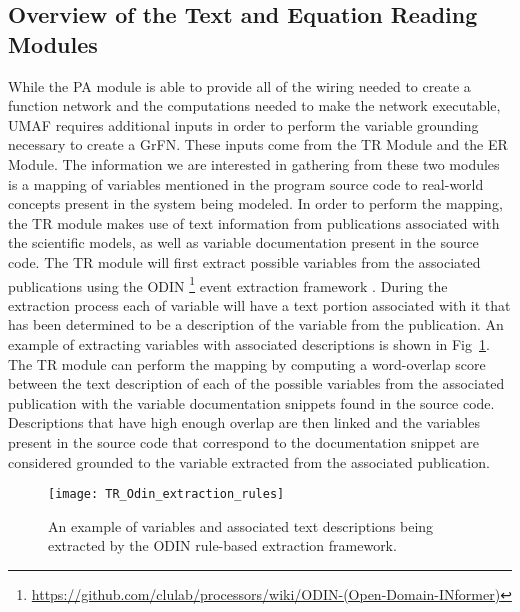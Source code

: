 \subsection{Overview of the Text and Equation Reading Modules \label{sec:ter_overview}}
While the PA module is able to provide all of the wiring needed to create a function network and the computations needed to make the network executable, UMAF requires additional inputs in order to perform the variable grounding necessary to create a GrFN.
These inputs come from the TR Module and the ER Module.
The information we are interested in gathering from these two modules is a mapping of variables mentioned in the program source code to real-world concepts present in the system being modeled.
In order to perform the mapping, the TR module makes use of text information from publications associated with the scientific models, as well as variable documentation present in the source code.
The TR module will first extract possible variables from the associated publications using the ODIN \footnote{\url{https://github.com/clulab/processors/wiki/ODIN-(Open-Domain-INformer)}} event extraction framework \citep{valenzuela2015Odin}.
During the extraction process each of variable will have a text portion associated with it that has been determined to be a description of the variable from the publication.
An example of extracting variables with associated descriptions is shown in Fig~\ref{fig:odin_extraction_example}.
The TR module can perform the mapping by computing a word-overlap score between the text description of each of the possible variables from the associated publication with the variable documentation snippets found in the source code.
Descriptions that have high enough overlap are then linked and the variables present in the source code that correspond to the documentation snippet are considered grounded to the variable extracted from the associated publication.

\begin{figure}[!htbp]
    \label{fig:odin_extraction_example}
    \centering
    \texttt{[image: TR\_Odin\_extraction\_rules]}%
    \caption[Example Variable Extraction via ODIN]{An example of variables and associated text descriptions being extracted by the ODIN rule-based extraction framework.}
\end{figure}

